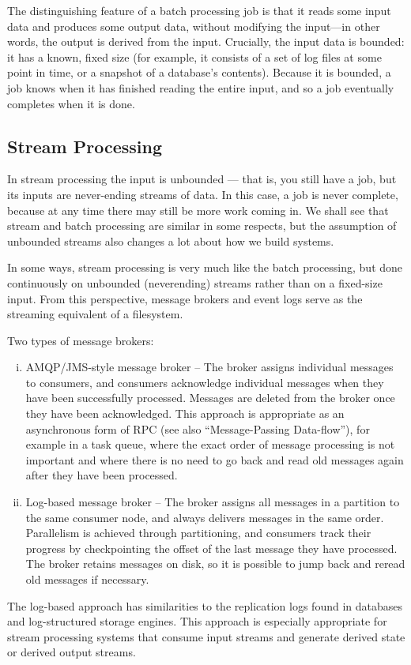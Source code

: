 \documentclass{article}
\begin{document}
    The distinguishing feature of a batch processing job is that it reads some input data and produces some output data, without modifying the input—in other words, the output is derived from the input. Crucially, the input data is bounded: it has a known, fixed size (for example, it consists of a set of log files at some point in time, or a snapshot of a database’s contents). Because it is bounded, a job knows when it has finished reading the entire input, and so a job eventually completes when it is done.
    
    \subsection{Stream Processing }
    
    In stream processing the input is unbounded — that is, you still have a job, but its inputs are never-ending streams of data. In this case, a job is never complete, because at any time there may still be more work coming in. We shall see that stream and batch processing are similar in some respects, but the assumption of unbounded streams also changes a lot about how we build systems.
    
    In some ways, stream processing is very much like the batch processing, but done continuously on unbounded (neverending) streams rather than on a fixed-size input. From this perspective, message brokers and event logs serve as the streaming equivalent of a filesystem.

    Two types of message brokers:
    \begin{enumerate}[i.]
        \item AMQP/JMS-style message broker -- The broker assigns individual messages to consumers, and consumers acknowledge individual messages when they have been successfully processed. Messages are deleted from the broker once they have been acknowledged. This approach is appropriate as an asynchronous form of RPC (see also ``Message-Passing Data-flow”), for example in a task queue, where the exact order of message processing is not important and where there is no need to go back and read old messages again after they have been processed.
        
        \item Log-based message broker -- The broker assigns all messages in a partition to the same consumer node, and always delivers messages in the same order. Parallelism is achieved through partitioning, and consumers track their progress by checkpointing the offset of the last message they have processed. The broker retains messages on disk, so it is possible to jump back and reread old messages if necessary.
        
    \end{enumerate}
    The log-based approach has similarities to the replication logs found in databases and log-structured storage engines. This approach is especially appropriate for stream processing systems that consume input streams and generate derived state or derived output streams.
    
\end{document}
